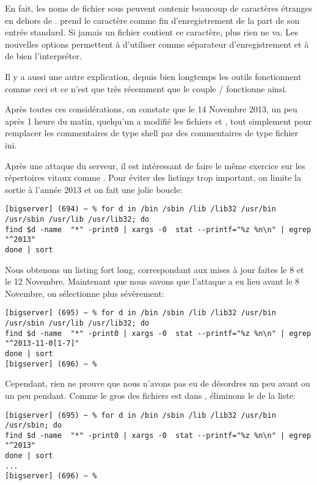 En fait, les noms de fichier sous \unix{} peuvent contenir beaucoup de caractères étranges en dehors de \code{/}.  prend le caractère  comme fin d'enregistrement de la part de son entrée standard. Si jamais un fichier contient ce caractère, plus rien ne va. Les nouvelles options permettent à  d'utiliser  comme séparateur d'enregistrement et à  de bien l'interpréter.

Il y a aussi une autre explication, depuis bien longtemps les outils \GNU{} fonctionnent comme ceci et ce n'est que très récemment que le couple / fonctionne ainsi.

Après toutes ces considérations, on constate que le 14 Novembre 2013, un peu après 1 heure du matin, quelqu'un a modifié les fichiers   et , tout simplement pour remplacer les commentaires de type shell par des commentaires de type fichier ini.

Après une attaque du serveur, il est intéressant de faire le même exercice sur les répertoires vitaux comme . Pour éviter des listings trop important, on limite la sortie à l'année 2013 et on fait une jolie boucle:

\begin{lstlisting}
[bigserver] (694) ~ % for d in /bin /sbin /lib /lib32 /usr/bin /usr/sbin /usr/lib /usr/lib32; do
find $d -name  "*" -print0 | xargs -0  stat --printf="%z %n\n" | egrep "^2013"
done | sort
\end{lstlisting}

Nous obtenons un listing fort long, correspondant aux mises à jour faites le 8 et le 12 Novembre. Maintenant que nous savons que l'attaque a eu lieu avant le 8 Novembre, on sélectionne plus sévèrement:

\begin{lstlisting}
[bigserver] (695) ~ % for d in /bin /sbin /lib /lib32 /usr/bin /usr/sbin /usr/lib /usr/lib32; do
find $d -name  "*" -print0 | xargs -0  stat --printf="%z %n\n" | egrep "^2013-11-0[1-7]"
done | sort
[bigserver] (696) ~ %
\end{lstlisting}

Cependant, rien ne prouve que nous n'avons pas eu de désordres un peu avant ou un peu pendant. Comme le gros des fichiers est dans , éliminons le de la liste:

\begin{lstlisting}
[bigserver] (695) ~ % for d in /bin /sbin /lib /lib32 /usr/bin /usr/sbin; do
find $d -name  "*" -print0 | xargs -0  stat --printf="%z %n\n" | egrep "^2013"
done | sort
...
[bigserver] (696) ~ %
\end{lstlisting}

